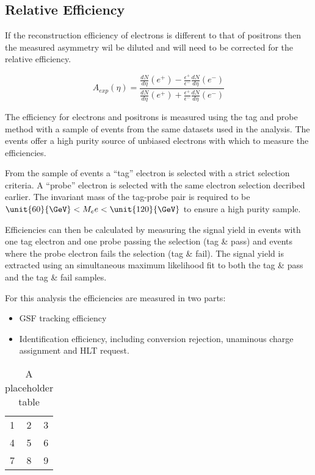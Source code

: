 \subsection{Relative Efficiency}

If the reconstruction efficiency of electrons is different to that of positrons
then the measured asymmetry wil be diluted and will need to be corrected for
the relative efficiency.

\begin{equation}
A_{exp}(\eta) = \frac{
                    \frac{dN}{d\eta}(e^+)-
                    \frac{\epsilon^+}{\epsilon^-}\frac{dN}{d\eta}(e^-)
                }
                {
                    \frac{dN}{d\eta}(e^+)+
                    \frac{\epsilon^+}{\epsilon^-}\frac{dN}{d\eta}(e^-)
                }
\end{equation}

The efficiency for electrons and positrons is measured using the tag and probe
method %
with a sample of \Zee events from the same datasets used in the analysis. 
The \Zee events offer a high purity source of unbiased electrons with which to
measure the efficiencies.

From the sample of \Zee events a ``tag'' electron is selected with a strict
selection criteria. 
A ``probe'' electron is selected with the same electron selection decribed
earlier.
The invariant mass of the tag-probe pair is required to be
$\unit{60}{\GeV} < M_ee < \unit{120}{\GeV}$ to ensure a high purity sample.

Efficiencies can then be calculated by measuring the signal yield in events
with one tag electron and one probe passing the selection (tag \& pass) and
events where the probe electron fails the selection (tag \& fail).
The signal yield is extracted using an simultaneous maximum likelihood fit to
both the tag \& pass and the tag \& fail samples.

For this analysis the efficiencies are measured in two parts:

\begin{itemize}
    \item GSF tracking efficiency
    \item Identification efficiency, including conversion rejection, unaminous
charge assignment and HLT request.
\end{itemize}

\begin{table}[htb]
  \centering
  \begin{tabular}{| l c r |}
    \hline
    1 & 2 & 3 \\
    4 & 5 & 6 \\
    7 & 8 & 9 \\
  \hline
  \end{tabular}
  \caption{A placeholder table}
  \label{asym36:tagprobe}
\end{table}

